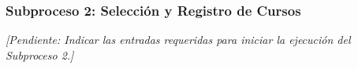 \subsubsection{Subproceso 2: Selección y Registro de Cursos}

\textit{[Pendiente: Indicar las entradas requeridas para iniciar la ejecución del Subproceso 2.]}

